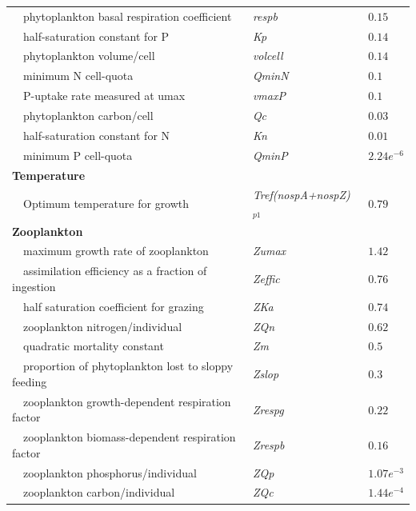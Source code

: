 \documentclass[review]{elsarticle}\usepackage[]{graphicx}\usepackage[]{color}
\begin{document}
\begin{table}[!tbp]
{\begin{center}
\begin{tabular}{lll}
~~phytoplankton basal respiration coefficient&\textit{respb}&$0.15$\tabularnewline
~~half-saturation constant for P&\textit{Kp}&$0.14$\tabularnewline
~~phytoplankton volume/cell&\textit{volcell}&$0.14$\tabularnewline
~~minimum N cell-quota&\textit{QminN}&$0.1$\tabularnewline
~~P-uptake rate measured at umax&\textit{vmaxP}&$0.1$\tabularnewline
~~phytoplankton carbon/cell&\textit{Qc}&$0.03$\tabularnewline
~~half-saturation constant for N&\textit{Kn}&$0.01$\tabularnewline
~~minimum P cell-quota&\textit{QminP}&$2.24e^{-6}$\tabularnewline
\hline
{\bfseries Temperature}&&\tabularnewline
~~Optimum temperature for growth&\textit{Tref(nospA+nospZ)$_{p1}$}&$0.79$\tabularnewline
\hline
{\bfseries Zooplankton}&&\tabularnewline
~~maximum growth rate of zooplankton&\textit{Zumax}&$1.42$\tabularnewline
~~assimilation efficiency as a fraction of ingestion&\textit{Zeffic}&$0.76$\tabularnewline
~~half saturation coefficient for grazing&\textit{ZKa}&$0.74$\tabularnewline
~~zooplankton nitrogen/individual&\textit{ZQn}&$0.62$\tabularnewline
~~quadratic mortality constant&\textit{Zm}&$0.5$\tabularnewline
~~proportion of phytoplankton lost to sloppy feeding&\textit{Zslop}&$0.3$\tabularnewline
~~zooplankton growth-dependent respiration factor&\textit{Zrespg}&$0.22$\tabularnewline
~~zooplankton biomass-dependent respiration factor&\textit{Zrespb}&$0.16$\tabularnewline
~~zooplankton phosphorus/individual&\textit{ZQp}&$1.07e^{-3}$\tabularnewline
~~zooplankton carbon/individual&\textit{ZQc}&$1.44e^{-4}$\tabularnewline
\hline
\end{tabular}\end{center}}
\end{table}
\end{document}
